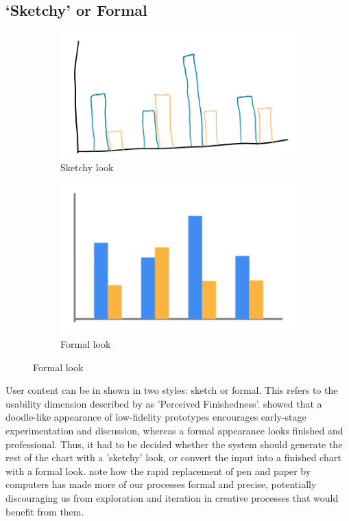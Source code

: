 	\subsection{`Sketchy' or Formal}	
	\begin{figure}[h]
		\centering
		\begin{subfigure}[b]{0.4\textwidth}
			\includegraphics[width=\textwidth]{sketchy}
			\caption{Sketchy look}
			\label{fig:sketchy}
		\end{subfigure}
		\begin{subfigure}[b]{0.4\textwidth}
			\includegraphics[width=\textwidth]{formal}
			\caption{Formal look}
			\label{fig:formal}
		\end{subfigure}
	\end{figure}
	User content can be in shown in two styles: sketch or formal. This refers to the usability dimension described by \cite{bresciani_collaborative_2008} as 'Perceived Finishedness'. \cite{yeung_effect_2008} showed that a doodle-like appearance of low-fidelity prototypes encourages early-stage experimentation and discussion, whereas a formal appearance looks finished and professional.  Thus, it had to be decided whether the system should generate the rest of the chart with a 'sketchy' look, or convert the input into a finished chart with a formal look. \cite{blackwell_formality_2008} note how the rapid replacement of pen and paper by computers has made more of our processes formal and precise, potentially discouraging us from exploration and iteration in creative processes that would benefit from them.
	
